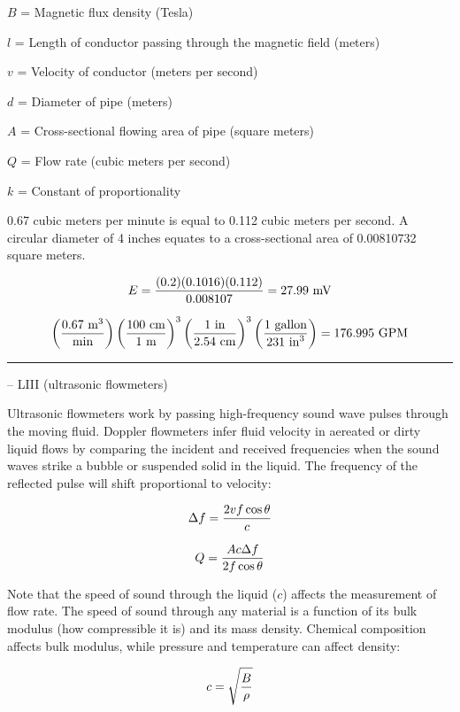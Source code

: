 \begin{itemize}
\begin{itemize}
$B$ = Magnetic flux density (Tesla)

$l$ = Length of conductor passing through the magnetic field (meters)

$v$ = Velocity of conductor (meters per second)

$d$ = Diameter of pipe (meters)

$A$ = Cross-sectional flowing area of pipe (square meters)

$Q$ = Flow rate (cubic meters per second)

$k$ = Constant of proportionality

\vskip 10pt

0.67 cubic meters per minute is equal to 0.112 cubic meters per second.  A circular diameter of 4 inches equates to a cross-sectional area of 0.00810732 square meters.

\vskip 10pt

$$E = {(0.2) (0.1016) (0.112) \over 0.008107} = 27.99 \hbox{ mV}$$

\vskip 10pt

$$\left({0.67 \hbox{ m}^3 \over \hbox{min}}\right) \left(100 \hbox{ cm} \over 1 \hbox{ m} \right)^3 \left(1 \hbox{ in} \over 2.54 \hbox{ cm}\right)^3 \left(1 \hbox{ gallon} \over 231 \hbox{ in}^3 \right) = 176.995 \hbox{ GPM}$$


\filbreak \vskip 5pt \hrule \vskip 5pt  -- LIII (ultrasonic flowmeters) \vskip 10pt

Ultrasonic flowmeters work by passing high-frequency sound wave pulses through the moving fluid.  Doppler flowmeters infer fluid velocity in aereated or dirty liquid flows by comparing the incident and received frequencies when the sound waves strike a bubble or suspended solid in the liquid.  The frequency of the reflected pulse will shift proportional to velocity:

$$\Delta f = {{2vf \cos \theta} \over {c}}$$

$$Q = {{Ac \Delta f} \over {2 f \cos \theta}}$$

Note that the speed of sound through the liquid ($c$) affects the measurement of flow rate.  The speed of sound through any material is a function of its bulk modulus (how compressible it is) and its mass density.  Chemical composition affects bulk modulus, while pressure and temperature can affect density:

$$c = \sqrt{B \over \rho}$$

\vskip 10pt


\end{itemize}
\end{itemize}
